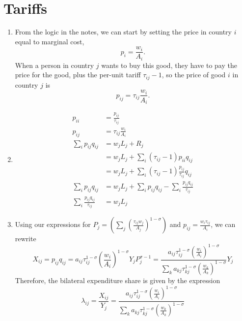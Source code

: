 \documentclass{article}
\begin{document}
\section{Tariffs}
\begin{enumerate}
    \item From the logic in the notes, we can start by setting the price in country $i$ equal to marginal cost,
    \[
    p_i = \frac{w_i}{A_i}.
    \]
    When a person in country $j$ wants to buy this good, they have to pay the price for the good, plus the per-unit tariff $\tau_{ij} - 1$, so the price of good $i$ in country $j$ is
    \[
    p_{ij} = \tau_{ij} \frac{w_i}{A_i}.
    \]
    \item
    \begin{align*}
        p_{ii} &= \frac{p_{ij}}{\tau_{ij}}\\
        p_{ij} &= \tau_{ij} \frac{w_i}{A_i}\\
        \sum_i p_{ij} q_{ij} &= w_j L_j + R_j\\
        &= w_j L_j + \sum_i (\tau_{ij} - 1) p_{ii} q_{ij}\\
        &= w_j L_j + \sum_i (\tau_{ij} - 1) \frac{p_{ij}}{\tau_{ij}} q_{ij}\\
        \sum_i p_{ij} q_{ij} &= w_j L_j + \sum_i p_{ij} q_{ij} - \sum_i \frac{p_{ij} q_{ij}}{\tau_{ij}}\\
        \sum_i \frac{p_{ij} q_{ij}}{\tau_{ij}} &= w_j L_j
    \end{align*}
    
    \item Using our expressions for $P_{j} = \left(\sum_{j}\left(\frac{\tau_{ij}w_{j}}{A_j}\right)^{1-\sigma}\right)$ and $p_{ij} = \frac{w_i\tau_{ij}}{A_{i}}$, we can rewrite
    \[
    X_{ij} = p_{ij}q_{ij} = a_{ij}\tau_{ij}^{1-\sigma}\left(\frac{w_i}{A_i}\right)^{1-\sigma}Y_{j}P_{j}^{\sigma-1} = \frac{a_{ij}\tau_{ij}^{1-\sigma}\left(\frac{w_i}{A_i}\right)^{1-\sigma}}{\sum_{k}a_{kj}\tau_{kj}^{1-\sigma}\left(\frac{w_k}{A_k}\right)^{1-\sigma}}Y_{j}
    \]
    Therefore, the bilateral expenditure share is given by the expression
    \[
    \lambda_{ij} = \frac{X_{ij}}{Y_j} =  \frac{a_{ij}\tau_{ij}^{1-\sigma}\left(\frac{w_i}{A_i}\right)^{1-\sigma}}{\sum_{k}a_{kj}\tau_{kj}^{1-\sigma}\left(\frac{w_k}{A_k}\right)^{1-\sigma}}
    \]
    

\end{enumerate}
\end{document}
